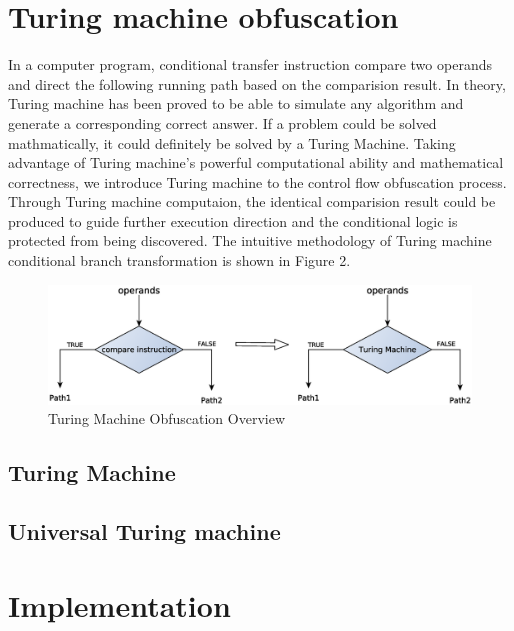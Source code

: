 \documentclass[lnicst]{svmultln}
\begin{document}
%
\section{Turing machine obfuscation}
%
In a computer program, conditional transfer instruction compare two operands and direct the following running path based on the comparision result. In theory, Turing machine has been proved to be able to simulate any algorithm and generate a corresponding correct answer. If a problem could be solved mathmatically, it could definitely be solved by a Turing Machine. Taking advantage of Turing machine's powerful computational ability and mathematical correctness, we introduce Turing machine to the control flow obfuscation process. Through Turing machine computaion, the identical comparision result could be produced to guide further execution direction and the conditional logic is protected from being discovered. The intuitive methodology of Turing machine conditional branch transformation is shown in Figure 2.
\begin{figure}
 \includegraphics[width=\linewidth]{figure2.eps}
 \caption{Turing Machine Obfuscation Overview}
 \label{Figure 2}
\end{figure}
\subsection{Turing Machine}

\subsection{Universal Turing machine}

\section{Implementation}
\end{document}

